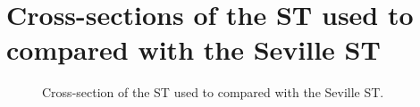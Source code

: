 \documentclass[a4paper,12pt,oneside]{book}
\begin{document}
\cite{MuellerStartup}
\cite{GribovIter2007}

\newpage






%




\appendix %




\chapter{Cross-sections of the ST used to compared with the Seville ST}
\label{app cross ST comparison}

\begin{figure}[htbp]
\centering

\hfill
{}
\hfill
{}
\caption{Cross-section of the ST used to compared with the Seville ST.}
\label{fig_cross_comp}
\end{figure}



\end{document}
